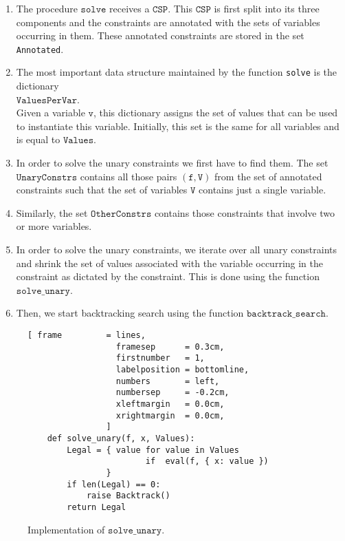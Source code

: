 \begin{enumerate}
\item The procedure $\texttt{solve}$ receives a $\texttt{CSP}$.  This $\texttt{CSP}$ is first split into its
      three components and the constraints are annotated with the sets of variables occurring in them.
      These annotated constraints are stored in the set \texttt{Annotated}.
\item The most important data structure maintained by the function \texttt{solve} is the dictionary
      \\[0.2cm]
      \hspace*{1.3cm}
      $\texttt{ValuesPerVar}$.  
      \\[0.2cm]
      Given a variable $\texttt{v}$, this dictionary assigns the set of values that can be used to instantiate this
      variable.  Initially, this set is the same for all variables and is equal to $\texttt{Values}$.
\item In order to solve the unary constraints we first have to find them.
      The set $\texttt{UnaryConstrs}$ contains all those pairs $(\texttt{f}, \texttt{V})$ from the set of
      annotated constraints such that the set of variables $\texttt{V}$ contains just a
      single variable. 
\item Similarly, the set $\texttt{OtherConstrs}$ contains those constraints that involve two or more variables.
\item In order to solve the unary constraints, we iterate over all unary constraints and shrink the set of
      values associated with the variable occurring in the constraint as dictated by the constraint.
      This is done using the function $\texttt{solve\_unary}$.
\item Then, we start backtracking search using the function $\texttt{backtrack\_search}$.  
\end{enumerate}

\begin{figure}[!ht]
\centering
\begin{Verbatim}[ frame         = lines, 
                  framesep      = 0.3cm, 
                  firstnumber   = 1,
                  labelposition = bottomline,
                  numbers       = left,
                  numbersep     = -0.2cm,
                  xleftmargin   = 0.0cm,
                  xrightmargin  = 0.0cm,
                ]
    def solve_unary(f, x, Values):
        Legal = { value for value in Values 
                        if  eval(f, { x: value })
                }
        if len(Legal) == 0:
            raise Backtrack()
        return Legal
\end{Verbatim}
\vspace*{-0.3cm}
\caption{Implementation of $\texttt{solve\_unary}$.}
\label{fig:Constraint-Propagation-Solver.ipynb:solve_unary}
\end{figure}

